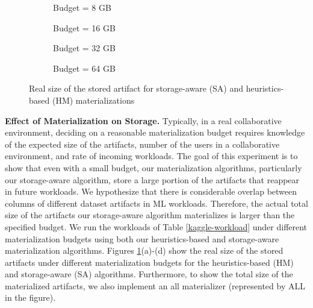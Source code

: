 \begin{figure}[t]
\begin{subfigure}[b]{0.5\linewidth}
\centering
 \resizebox{\columnwidth}{!}{%
%
}
\caption{Budget = 8 GB}
\end{subfigure}%
\begin{subfigure}[b]{0.5\linewidth}
\centering
 \resizebox{\columnwidth}{!}{%
%
}
\caption{Budget = 16 GB}
\end{subfigure}
\begin{subfigure}[b]{0.5\linewidth}
\centering
 \resizebox{\columnwidth}{!}{%
%
}
\caption{Budget = 32 GB}
\end{subfigure}%
\begin{subfigure}[b]{0.5\linewidth}
\centering
 \resizebox{\columnwidth}{!}{%
%
}
\caption{Budget = 64 GB}
\end{subfigure}
\caption{Real size of the stored artifact for storage-aware (SA) and heuristics-based (HM) materializations}
\label{exp-sa-vs-simple-size}
\end{figure}
\textbf{Effect of Materialization on Storage.}
Typically, in a real collaborative environment, deciding on a reasonable materialization budget requires knowledge of the expected size of the artifacts, number of the users in a collaborative environment, and rate of incoming workloads.
The goal of this experiment is to show that even with a small budget, our materialization algorithms, particularly our storage-aware algorithm, store a large portion of the artifacts that reappear in future workloads.
We hypothesize that there is considerable overlap between columns of different dataset artifacts in ML workloads.
Therefore, the actual total size of the artifacts our storage-aware algorithm materializes is larger than the specified budget.
We run the workloads of Table \ref{kaggle-workload} under different materialization budgets using both our heuristics-based and storage-aware materialization algorithms.
Figures \ref{exp-sa-vs-simple-size}(a)-(d) show the real size of the stored artifacts under different materialization budgets for the heuristics-based (HM) and storage-aware (SA) algorithms.
Furthermore, to show the total size of the materialized artifacts, we also implement an all materializer (represented by ALL in the figure).
